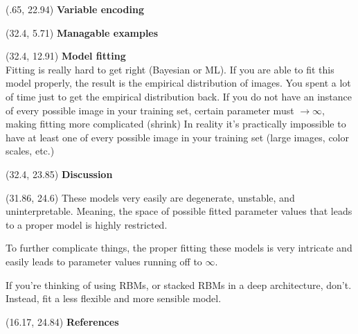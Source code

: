 \documentclass[extrafontsizes, 30pt]{memoir}
\begin{document}
\begin{textblock}{14}(.65, 22.94)
{\large \bfseries Variable encoding}

\end{textblock}

\begin{textblock}{14}(32.4, 5.71)
{\large \bfseries Managable examples} \\[.25cm]
\end{textblock}

\begin{textblock}{14}(32.4, 12.91)
{\large \bfseries Model fitting} \\[.25cm]
Fitting is really hard to get right (Bayesian or ML).
If you are able to fit this model properly, the result is the empirical distribution of images.
You spent a lot of time just to get the empirical distribution back.
If you do not have an instance of every possible image in your training set, certain parameter must $\rightarrow \infty$, making fitting more complicated (shrink)
In reality it's practically impossible to have at least one of every possible image in your training set (large images, color scales, etc.)

\end{textblock}

\begin{textblock}{14}(32.4, 23.85)
{\large \bfseries Discussion} \\[.25cm]
\end{textblock}

\begin{textblock}{14.54}(31.86, 24.6)
These models very easily are degenerate, unstable, and uninterpretable. Meaning, the space of possible fitted parameter values that leads to a proper model is highly restricted.

To further complicate things, the proper fitting these models is very intricate and easily leads to parameter values running off to $\infty$.

If you're thinking of using RBMs, or stacked RBMs in a deep architecture, don't. Instead, fit a less flexible and more sensible model.
\end{textblock}

\begin{textblock}{14.5}(16.17, 24.84)
{\large \bfseries References}
\printbibliography[heading=none]

\end{textblock}
\end{document}
